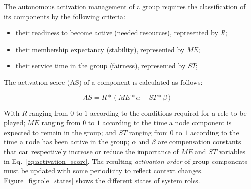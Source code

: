 

The autonomous activation management of a group requires the classification of its components by the following criteria:

\begin{itemize}

\item their readiness to become active (needed resources), represented by $R$;

\item their membership expectancy (stability), represented by $ME$; 

\item their service time in the group (fairness), represented by $ST$;

\end{itemize}

The activation score (AS) of a component is calculated as follows:

\begin{equation}
AS = R * (ME * \alpha - ST * \beta)
\end{equation}\label{eq:activation_score}

With $R$ ranging from $0$ to $1$ according to the conditions required for a role to be played; $ME$ ranging from $0$ to $1$ according to the time a node component is expected to remain in the group; and $ST$ ranging from $0$ to $1$ according to the time a node has been active in the group; $\alpha$ and $\beta$ are compensation constants that can respectively increase or reduce the importance of $ME$ and $ST$ variables in Eq.~\ref{eq:activation_score}. The resulting \textit{activation order} of group components must be updated with some periodicity to reflect context changes. Figure~\ref{fig:role_states} shows the different states of system roles.


